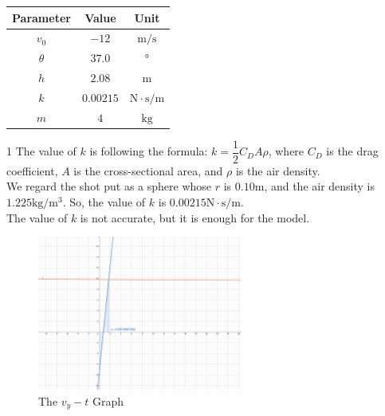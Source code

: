 \documentclass{article}
\begin{document}
\begin{table}[H]
  \centering
  \begin{threeparttable}
    \begin{tabular}{ccc}
      \hline
      \hspace{1cm}\textbf{Parameter}\hspace{1cm} & \hspace{1cm}\textbf{Value}\hspace{1cm} & \hspace{1cm}\textbf{Unit}\hspace{1cm} \\
      \hline
      $v_0$ & $-12$ & $\si{\meter/\second}$ \\
      $\theta$ & $37.0$ & $\si{\degree}$ \\
      $h$ & $2.08$ & $\si{\meter}$ \\
      $k$ & $0.00215$ \tnote{1} & $\si{\newton\cdot\second/\meter}$ \\
      $m$ & $4$ & $\si{\kilo\gram}$ \\
      \hline
    \end{tabular}
    \begin{tablenotes}
      \item [1] The value of $k$ is following the formula: $k=\dfrac{1}{2}C_DA\rho$, where $C_D$ is the drag coefficient, $A$ is the cross-sectional area, and $\rho$ is the air density. \\
      We regard the shot put as a sphere whose $r$ is $0.10 \si{\meter}$, and the air density is $1.225\si{\kilo\gram/\meter^3}$. So, the value of $k$ is $0.00215\si{\newton\cdot\second/\meter}$. \\
      The value of $k$ is not accurate, but it is enough for the model.
    \end{tablenotes}
  \end{threeparttable}
\end{table}

\begin{figure}[H]
    \centering
    \includegraphics[width=0.6\textwidth]{figures/figure-1.pdf}
    \caption{The $v_y-t$ Graph}
    \label{fig:vy-t}
\end{figure}
\end{document}
